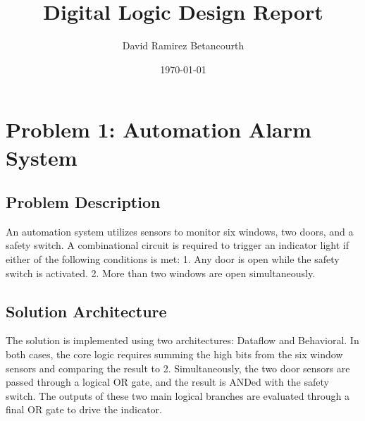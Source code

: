 \documentclass{article}
\title{Digital Logic Design Report}
\author{David Ramirez Betancourth}
\date{\today}
\begin{document}
\maketitle

\section{Problem 1: Automation Alarm System}

\subsection{Problem Description}
An automation system utilizes sensors to monitor six windows, two doors, and a safety switch. A combinational circuit is required to trigger an indicator light if either of the following conditions is met:
1. Any door is open while the safety switch is activated.
2. More than two windows are open simultaneously.

\subsection{Solution Architecture}
The solution is implemented using two architectures: Dataflow and Behavioral. In both cases, the core logic requires summing the high bits from the six window sensors and comparing the result to 2. Simultaneously, the two door sensors are passed through a logical OR gate, and the result is ANDed with the safety switch. The outputs of these two main logical branches are evaluated through a final OR gate to drive the indicator.
\end{document}
